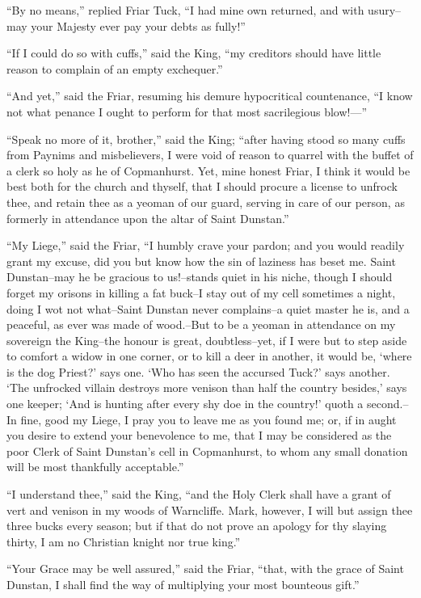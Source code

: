 ``By no means,'' replied Friar Tuck, ``I had mine own returned, and with
usury--may your Majesty ever pay your debts as fully!''

``If I could do so with cuffs,'' said the King, ``my creditors should
have little reason to complain of an empty exchequer.''

``And yet,'' said the Friar, resuming his demure hypocritical
countenance, ``I know not what penance I ought to perform for that most
sacrilegious blow!---''

``Speak no more of it, brother,'' said the King; ``after having stood so
many cuffs from Paynims and misbelievers, I were void of reason to
quarrel with the buffet of a clerk so holy as he of Copmanhurst. Yet,
mine honest Friar, I think it would be best both for the church and
thyself, that I should procure a license to unfrock thee, and retain
thee as a yeoman of our guard, serving in care of our person, as
formerly in attendance upon the altar of Saint Dunstan.''

``My Liege,'' said the Friar, ``I humbly crave your pardon; and you
would readily grant my excuse, did you but know how the sin of laziness
has beset me. Saint Dunstan--may he be gracious to us!--stands quiet in
his niche, though I should forget my orisons in killing a fat buck--I
stay out of my cell sometimes a night, doing I wot not what--Saint
Dunstan never complains--a quiet master he is, and a peaceful, as ever
was made of wood.--But to be a yeoman in attendance on my sovereign the
King--the honour is great, doubtless--yet, if I were but to step aside
to comfort a widow in one corner, or to kill a deer in another, it would
be, `where is the dog Priest?' says one. `Who has seen the accursed
Tuck?' says another. `The unfrocked villain destroys more venison than
half the country besides,' says one keeper; `And is hunting after every
shy doe in the country!' quoth a second.--In fine, good my Liege, I pray
you to leave me as you found me; or, if in aught you desire to extend
your benevolence to me, that I may be considered as the poor Clerk of
Saint Dunstan's cell in Copmanhurst, to whom any small donation will be
most thankfully acceptable.''

``I understand thee,'' said the King, ``and the Holy Clerk shall have a
grant of vert and venison in my woods of Warncliffe. Mark, however, I
will but assign thee three bucks every season; but if that do not prove
an apology for thy slaying thirty, I am no Christian knight nor true
king.''

``Your Grace may be well assured,'' said the Friar, ``that, with the
grace of Saint Dunstan, I shall find the way of multiplying your most
bounteous gift.''

